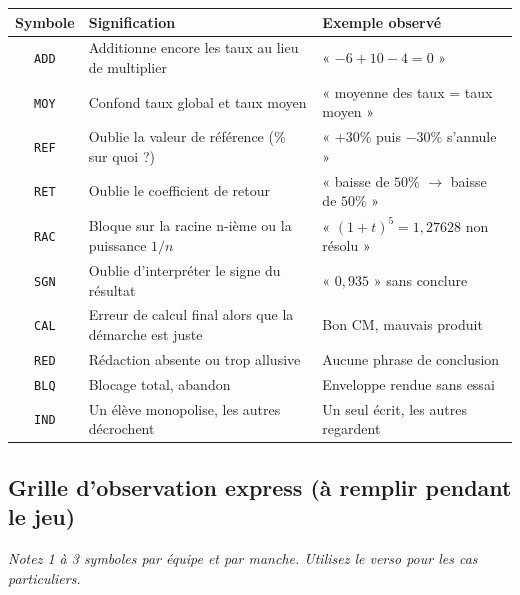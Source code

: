 \documentclass[12pt,a4paper]{article}
\begin{document}
\begin{center}
	\renewcommand{\arraystretch}{1.4}
	\begin{tabular}{|c|>{\raggedright\arraybackslash}p{6cm}|>{\raggedright\arraybackslash}p{7.5cm}|}
		\hline
		\textbf{Symbole} & \textbf{Signification} & \textbf{Exemple observé} \\
		\hline
		\texttt{ADD} & Additionne encore les taux au lieu de multiplier & « \(-6+10-4=0\) » \\
		\hline
		\texttt{MOY} & Confond taux global et taux moyen & « moyenne des taux = taux moyen » \\
		\hline
		\texttt{REF} & Oublie la valeur de référence (\% sur quoi ?) & « \(+30\%\) puis \(-30\%\) s'annule » \\
		\hline
		\texttt{RET} & Oublie le coefficient de retour & « baisse de \(50\%\) \(\to\) baisse de \(50\%\) » \\
		\hline
		\texttt{RAC} & Bloque sur la racine n-ième ou la puissance \(1/n\) & « \((1+t)^5 = 1{,}27628\) non résolu » \\
		\hline
		\texttt{SGN} & Oublie d'interpréter le signe du résultat & « \(0{,}935\) » sans conclure \\
		\hline
		\texttt{CAL} & Erreur de calcul final alors que la démarche est juste & Bon CM, mauvais produit \\
		\hline
		\texttt{RED} & Rédaction absente ou trop allusive & Aucune phrase de conclusion \\
		\hline
		\texttt{BLQ} & Blocage total, abandon & Enveloppe rendue sans essai \\
		\hline
		\texttt{IND} & Un élève monopolise, les autres décrochent & Un seul écrit, les autres regardent \\
		\hline
	\end{tabular}
\end{center}

\vspace{0.4cm}

\subsection*{Grille d'observation express (à remplir pendant le jeu)}

\begin{center}
	{\small\itshape Notez 1 à 3 symboles par équipe et par manche. Utilisez le verso pour les cas particuliers.}
\end{center}

\vspace{0.2cm}
\end{document}
